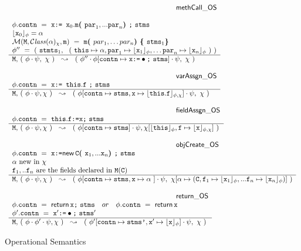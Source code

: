 \begin{figure*}
$\begin{array}{l}
\inferenceruleNN {methCall\_OS} {
\\
\phi.\prg{contn}\ =\ \x {\kw{:= }} \x_0.\m \lp \prg{par}_1, ... \prg{par}_n \rp \semi \prg{stms}
\\
\interp{\x_0}{\phi} = \alpha
\\
\Meths {} {\ClassOf {\alpha} {\chi}} {\m} \  =  \ \m\lp par_1, \ldots par_n \rp \lb \prg{stms}_1   \rb
  \\
 \phi''\ =\  (\  \prg{stmts}_1,\ \ (\ \this \mapsto \alpha,
  \prg{par}_1 \mapsto  \interp{\x_1}{\phi}, \ldots \prg{par}_n \mapsto  \interp{\x_n}{\phi}\ ) \ )
}
{
 \M,\, (\ \phi\cdot\psi,\ \chi\ )\ \ \leadsto\  \ (\ \phi''\cdot\phi[\prg{contn}\mapsto\x  \kw{:=} \bullet \semi \prg{stms}] \cdot\psi,\ \chi\ )
}

\\ \\
\inferenceruleNN {varAssgn\_OS} {
 \phi.\prg{contn} \ = \ \x  {\kw{:= }}   \this.\f \ \semi \prg{stms}
}
{
 \M,\,  (\ \phi\cdot\psi, \chi\ )\ \ \leadsto\  \ (\ \phi[ \prg{contn} \mapsto \prg{stms}, \x\mapsto \interp{\this.\f}{\phi,\chi}] \cdot\psi,\ \chi\  )
}
\\
\\
\inferenceruleNN{fieldAssgn\_OS} {
 \phi.\prg{contn}\ =\  \this.\f  \kw{:=} \x  \semi \prg{stms}
}
{
 \M,\,  (\ \phi\cdot\psi, \chi\  )\ \ \leadsto\  \ (\ \phi[\prg{contn}\mapsto  \prg{stms} ] \cdot\psi, \chi[\interp{\this}{\phi},\f \mapsto \interp{\x}{\phi,\chi}]\  )
}
\\
\\
\inferenceruleNN {objCreate\_OS} {
 \phi.\prg{contn}\ =\  \x  \kw{:=} \kwN{new }\, \c \lp \x_1, ... \x_n \rp  \semi \prg{stms}
 \\
 \alpha\ \mbox{new in}\ \chi
 \\
\f_1, .. \f_n\ \mbox{are the fields declared in } \M(\c)
}
{
 \M,\,  (\ \phi\cdot\psi, \chi\ )\ \ \leadsto\  \ (\ \phi[\prg{contn}\mapsto  \prg{stms},\x \mapsto \alpha\ ] \cdot\psi, \ \chi[\alpha \mapsto (\c,\f_1 \mapsto \interp{\x_1}{\phi},  ... \f_n \mapsto \interp{\x_n}{\phi}  ) ]\ )
}
\\
\\
\inferenceruleNN {return\_OS} {
 \phi.\prg{contn}\ =\   {\kwN{return }}\, \x  \semi \prg{stms}\ \  \ or\  \ \  \phi.\prg{contn}\ =\   {\kwN{return}}\, \x
 \\
\phi'.\prg{contn}\ =\  \x' \kw{:=} \bullet  \semi \prg{stms}'
}
{
 \M,\,  (\ \phi\cdot\phi'\cdot\psi, \chi\ )\ \ \leadsto\  \ (\ \phi'[\prg{contn}\mapsto  \prg{stms'},\x' \mapsto \interp{\x}{\phi}] \cdot\psi, \ \chi \ )
}
\end{array}
$
\caption{Operational Semantics}
\label{fig:Execution}
\end{figure*}

